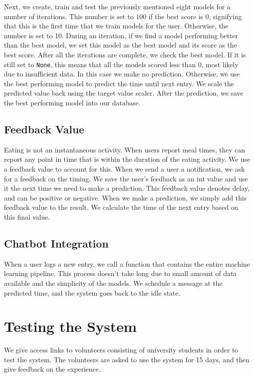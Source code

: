 Next, we create, train and test the previously mentioned eight models for a number of iterations.
This number is set to $100$ if the best score is $0$, signifying that this is the first time that we train models for the user.
Otherwise, the number is set to 10.
During an iteration, if we find a model performing better than the best model, we set this model as the best model and its score as the best score.
After all the iterations are complete, we check the best model.
If it is still set to \texttt{None}, this means that all the models scored less than $0$, most likely due to insufficient data.
In this case we make no prediction.
Otherwise, we use the best performing model to predict the time until next entry.
We scale the predicted value back using the target value scaler.
After the prediction, we save the best performing model into our database.

\subsection{Feedback Value}
Eating is not an instantaneous activity.
When users report meal times, they can report any point in time that is within the duration of the eating activity.
We use a feedback value to account for this.
When we send a user a notification, we ask for a feedback on the timing.
We save the user's feedback as an int value and use it the next time we need to make a prediction.
This feedback value denotes delay, and can be positive or negative.
When we make a prediction, we simply add this feedback value to the result.
We calculate the time of the next entry based on this final value.

\subsection{Chatbot Integration}
When a user logs a new entry, we call a function that contains the entire machine learning pipeline.
This process doesn't take long due to small amount of data available and the simplicity of the models.
We schedule a message at the predicted time, and the system goes back to the idle state.
\section{Testing the System}
We give access links to volunteers consisting of university students in order to test the system.
The volunteers are asked to use the system for 15 days, and then give feedback on the experience.
